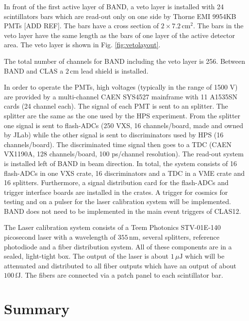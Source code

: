 \documentclass[review]{elsarticle}
\begin{document}
In front of the first active layer of BAND, a veto layer is installed with 24 scintillators bars which are read-out only on one side by Thorne EMI 9954KB PMTs [ADD REF]. The bars have a cross section of $2 \times 7.2\,\mathrm{cm}^{2}$. The bars in the veto layer have the same length as the bars of one layer of the active detector area. The veto layer is shown in Fig. \ref{fig:vetolayout}.

The total number of channels for BAND including the veto layer is 256. Between BAND and CLAS a $2\,\mathrm{cm}$ lead shield is installed.

In order to operate the PMTs, high voltages (typically in the range of 1500 V) are provided by a multi-channel CAEN SYS4527 mainframe with 11 A1535SN cards (24 channel each).
The signal of each PMT is sent to an splitter. The splitter are the same as the one used by the HPS experiment.
From the splitter one signal is sent to flash-ADCs (250 VXS, 16 channels/board, made and owned by JLab) while the other signal is sent to  discriminators used by HPS (16 channels/board).
The discriminated time signal then goes to a TDC (CAEN VX1190A, 128 channels/board, 100 ps/channel resolution). The read-out system is installed left of BAND in beam direction. 
In total, the system consists of 16 flash-ADCs in one VXS crate, 16 discriminators and a TDC in a VME crate and 16 splitters.  Furthermore, a signal distribution card for the flash-ADCs and trigger interface boards are installed in the crates. A trigger for cosmics for testing and on a pulser for the laser calibration system will be implemented. BAND does not need to be implemented in the main event triggers of CLAS12.

The Laser calibration system consists of a Teem Photonics STV-01E-140 picosecond laser with a wavelength of $355\,\mathrm{nm}$, several splitters, reference photodiode and a fiber distribution system. All of these components are in a sealed, light-tight box. The output of the laser is about $1\,\mu\mathrm{J}$ which will be attenuated and distributed to all fiber outputs which have an output of about $100\,\mathrm{fJ}$. The fibers are connected via a patch panel to each scintillator bar. 

\fi


\section{Summary}
\end{document}
